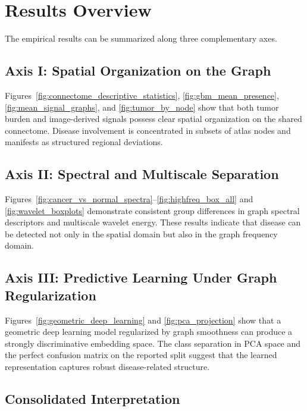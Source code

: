 \section{Results Overview}
\label{sec:ch4_results_overview} %

The empirical results can be summarized along three complementary axes.

\subsection{Axis I: Spatial Organization on the Graph} %

Figures~\ref{fig:connectome_descriptive_statistics}, \ref{fig:gbm_mean_presence}, \ref{fig:mean_signal_graphs}, and \ref{fig:tumor_by_node} show that both tumor burden and image-derived signals possess clear spatial organization on the shared connectome. Disease involvement is concentrated in subsets of atlas nodes and manifests as structured regional deviations. %

\subsection{Axis II: Spectral and Multiscale Separation} %

Figures~\ref{fig:cancer_vs_normal_spectra}--\ref{fig:highfreq_box_all} and \ref{fig:wavelet_boxplots} demonstrate consistent group differences in graph spectral descriptors and multiscale wavelet energy. These results indicate that disease can be detected not only in the spatial domain but also in the graph frequency domain. %

\subsection{Axis III: Predictive Learning Under Graph Regularization} %

Figures~\ref{fig:geometric_deep_learning} and \ref{fig:pca_projection} show that a geometric deep learning model regularized by graph smoothness can produce a strongly discriminative embedding space. The class separation in PCA space and the perfect confusion matrix on the reported split suggest that the learned representation captures robust disease-related structure. %

\subsection{Consolidated Interpretation}

